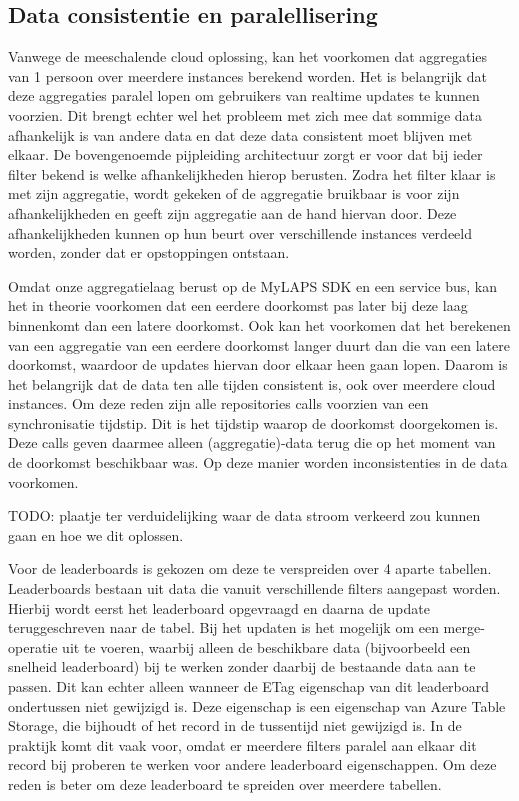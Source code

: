 \subsection{Data consistentie en paralellisering}
Vanwege de meeschalende cloud oplossing, kan het voorkomen dat aggregaties van 1 persoon over meerdere instances berekend worden. Het is belangrijk dat deze aggregaties paralel lopen om gebruikers van realtime updates te kunnen voorzien. Dit brengt echter wel het probleem met zich mee dat sommige data afhankelijk is van andere data en dat deze data consistent moet blijven met elkaar. De bovengenoemde pijpleiding architectuur zorgt er voor dat bij ieder filter bekend is welke afhankelijkheden hierop berusten. Zodra het filter klaar is met zijn aggregatie, wordt gekeken of de aggregatie bruikbaar is voor zijn afhankelijkheden en geeft zijn aggregatie aan de hand hiervan door. Deze afhankelijkheden kunnen op hun beurt over verschillende instances verdeeld worden, zonder dat er opstoppingen ontstaan.

Omdat onze aggregatielaag berust op de MyLAPS SDK en een service bus, kan het in theorie voorkomen dat een eerdere doorkomst pas later bij deze laag binnenkomt dan een latere doorkomst. Ook kan het voorkomen dat het berekenen van een aggregatie van een eerdere doorkomst langer duurt dan die van een latere doorkomst, waardoor de updates hiervan door elkaar heen gaan lopen. Daarom is het belangrijk dat de data ten alle tijden consistent is, ook over meerdere cloud instances.
Om deze reden zijn alle repositories calls voorzien van een synchronisatie tijdstip. Dit is het tijdstip waarop de doorkomst doorgekomen is. Deze calls geven daarmee alleen (aggregatie)-data terug die op het moment van de doorkomst beschikbaar was. Op deze manier worden inconsistenties in de data voorkomen.

{\par \bigskip \par \color{red} TODO: plaatje ter verduidelijking waar de data stroom verkeerd zou kunnen gaan en hoe we dit oplossen. \par \bigskip \par }

Voor de leaderboards is gekozen om deze te verspreiden over 4 aparte tabellen. Leaderboards bestaan uit data die vanuit verschillende filters aangepast worden. Hierbij wordt eerst het leaderboard opgevraagd en daarna de update teruggeschreven naar de tabel. Bij het updaten is het mogelijk om een merge-operatie uit te voeren, waarbij alleen de beschikbare data (bijvoorbeeld een snelheid leaderboard) bij te werken zonder daarbij de bestaande data aan te passen. Dit kan echter alleen wanneer de ETag eigenschap van dit leaderboard ondertussen niet gewijzigd is. Deze eigenschap is een eigenschap van Azure Table Storage, die bijhoudt of het record in de tussentijd niet gewijzigd is. In de praktijk komt dit vaak voor, omdat er meerdere filters paralel aan elkaar dit record bij proberen te werken voor andere leaderboard eigenschappen. Om deze reden is beter om deze leaderboard te spreiden over meerdere tabellen.

